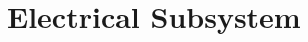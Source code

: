 \documentclass[../../main.tex]{subfiles}
\begin{document}
\chapter{Electrical Subsystem}




\end{document}
